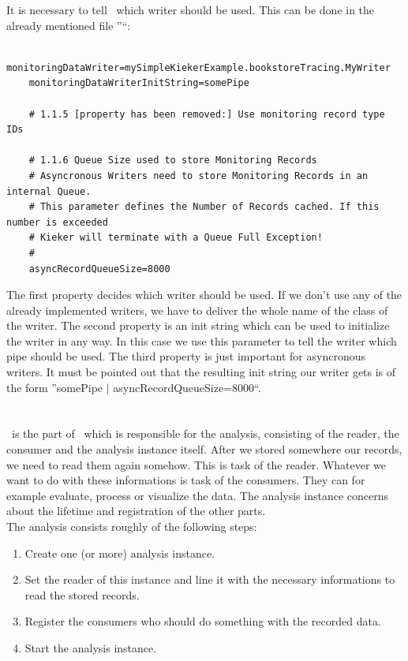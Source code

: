 \documentclass[a4paper, oneside, 11pt]{scrartcl}
\begin{document}
      It is necessary to tell \KiekerMonitoring\ which writer should be used. This can be done in the already mentioned file ''\monitoringPropertiesFile``:
      \setBashListing
      \begin{lstlisting}
	monitoringDataWriter=mySimpleKiekerExample.bookstoreTracing.MyWriter
	monitoringDataWriterInitString=somePipe

	# 1.1.5 [property has been removed:] Use monitoring record type IDs

	# 1.1.6 Queue Size used to store Monitoring Records
	# Asyncronous Writers need to store Monitoring Records in an internal Queue.
	# This parameter defines the Number of Records cached. If this number is exceeded
	# Kieker will terminate with a Queue Full Exception!
	#
	asyncRecordQueueSize=8000
      \end{lstlisting}
      The first property decides which writer should be used. If we don't use any of the already implemented writers, we have to deliver the whole name of the class of the writer. The second property is an init string which can be used to initialize the writer in any way. In this case we use this parameter to tell the writer which pipe should be used. The third property is just important for asyncronous writers. It must be pointed out that the resulting init string our writer gets is of the form ''somePipe $|$ asyncRecordQueueSize=8000``. 


    \section{\KiekerAnalysis}
      \KiekerAnalysis\ is the part of \Kieker\ which is responsible for the analysis, consisting of the reader, the consumer and the analysis instance itself. After we stored somewhere our records, we need to read them again somehow. This is task of the reader. Whatever we want to do with these informations is task of the consumers. They can for example evaluate, process or visualize the data. The analysis instance concerns about the lifetime and registration of the other parts.\\
      The analysis consists roughly of the following steps:
      \begin{enumerate}
	\item Create one (or more) analysis instance.
	\item Set the reader of this instance and line it with the necessary informations to read the stored records.
	\item Register the consumers who should do something with the recorded data.
	\item Start the analysis instance.
      \end{enumerate}
\end{document}
